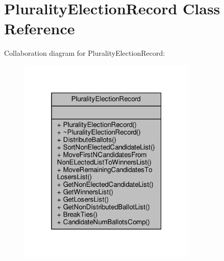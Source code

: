 \hypertarget{classPluralityElectionRecord}{}\section{Plurality\+Election\+Record Class Reference}
\label{classPluralityElectionRecord}


Collaboration diagram for Plurality\+Election\+Record\+:
\nopagebreak
\begin{figure}[H]
\begin{center}
\leavevmode
\includegraphics[width=241pt]{classPluralityElectionRecord__coll__graph}
\end{center}
\end{figure}
